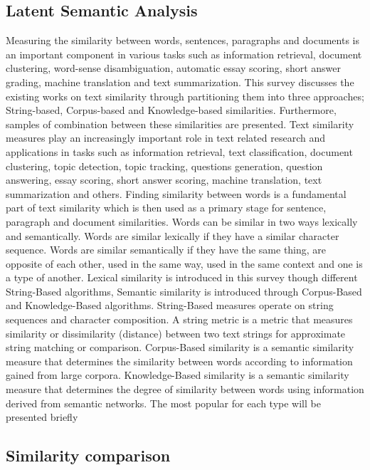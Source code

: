 \documentclass[a4paper,twocolumn,twoside]{article}
\begin{document}
	\subsection{Latent Semantic Analysis}
Measuring the similarity between words, sentences, paragraphs and documents is an important component in various tasks such as information retrieval, document clustering, word-sense disambiguation, automatic essay scoring, short answer grading, machine translation and text summarization. 
This survey discusses the existing works on text similarity through partitioning them into three approaches; String-based, Corpus-based and Knowledge-based similarities. 
Furthermore, samples of combination between these similarities are presented.
Text similarity measures play an increasingly important role in text related research and applications in tasks such as information retrieval, text classification, document clustering, topic detection, topic tracking, questions generation, question answering, essay scoring, short answer scoring, machine translation, text summarization and others. 
Finding similarity between words is a fundamental part of text similarity which is then used as a primary stage for sentence, paragraph and document similarities. 
Words can be similar in two ways lexically and semantically. Words are similar lexically if they have a similar character sequence. Words are similar semantically if they have the same thing, are opposite of each other, used in the same way, used in the same context and one is a type of another. 
Lexical similarity is introduced in this survey though different String-Based algorithms, Semantic similarity is introduced through Corpus-Based and Knowledge-Based algorithms. 
String-Based measures operate on string sequences and character composition. A string metric is a metric that measures similarity or dissimilarity (distance) between two text strings for approximate string matching or comparison. 
Corpus-Based similarity is a semantic similarity measure that determines the similarity between words according to information gained from large corpora. 
Knowledge-Based similarity is a semantic similarity measure that determines the degree of similarity between words using information derived from semantic networks. The most popular for each type will be presented briefly
	\subsection{Similarity comparison}
\end{document}
